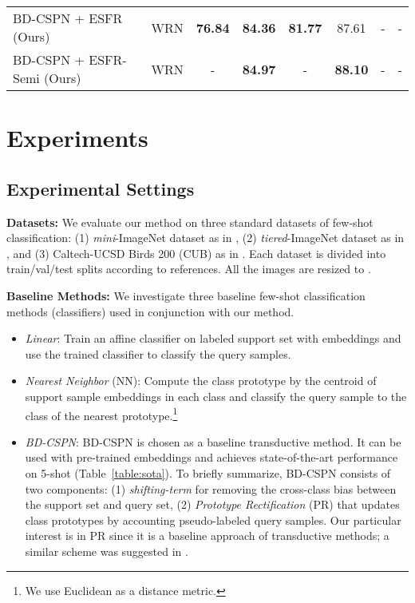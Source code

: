 \documentclass{article}
\begin{document}
\begin{table*}[t]
\begin{small}
\begin{center}
\begin{tabular}{lccccccc}
				\rowcolor[HTML]{EFEFEF} BD-CSPN + ESFR (Ours) & WRN               & \textbf{76.84}       & \textbf{84.36}      & \textbf{81.77}        & 87.61       & -               & -               \\
				\rowcolor[HTML]{EFEFEF} BD-CSPN + ESFR-Semi (Ours) & WRN               & -       & \textbf{84.97}      & -        & \textbf{88.10}       & -               & -               \\ \hline
\end{tabular}
		\end{center}
	\end{small}
	\vskip -0.2in
\end{table*} \section{Experiments}
\subsection{Experimental Settings}
\textbf{Datasets:}
We evaluate our method on three standard datasets of few-shot classification: (1) \textit{mini}-ImageNet \cite{vinyals2016matching} dataset as in \citet{ravi2016optimization}, (2) \textit{tiered}-ImageNet dataset as in \citet{ren2018metalearning}, and (3) Caltech-UCSD Birds 200 (CUB) \cite{welinder2010caltech} as in \citet{Chen19}. Each dataset is divided into train/val/test splits according to references. All the images are resized to .

\textbf{Baseline Methods:}
We investigate three baseline few-shot classification methods (classifiers) used in conjunction with our method.
\begin{itemize}[leftmargin=*]
	\vspace{-0.1in}
	\item \textit{Linear}: Train an affine classifier on labeled support set with embeddings and use the trained classifier to classify the query samples.
	\item \textit{Nearest Neighbor} (NN): Compute the class prototype by the centroid of support sample embeddings in each class and classify the query sample to the class of the nearest prototype.\footnote{We use Euclidean as a distance metric.}
	\item \textit{BD-CSPN}: BD-CSPN \cite{BDCSPN} is chosen as a baseline transductive method.
	It can be used with pre-trained embeddings and achieves state-of-the-art performance on 5-shot (Table~\ref{table:sota}).
	To briefly summarize, BD-CSPN consists of two components: (1) \textit{shifting-term} for removing the cross-class bias between the support set and query set, (2) \textit{Prototype Rectification} (PR) that updates class prototypes by accounting pseudo-labeled query samples.
	Our particular interest is in PR since it is a baseline approach of transductive methods; a similar scheme was suggested in \citet{ren2018metalearning, CAN}.
\end{itemize}
\end{document}
